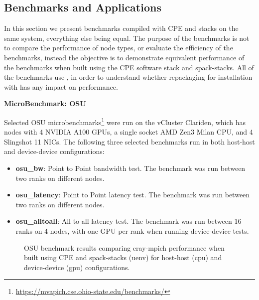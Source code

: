 \subsection{Benchmarks and Applications}

In this section we present benchmarks compiled with CPE and \spack stacks on the same system, everything else being equal.
The purpose of the benchmarks is not to compare the performance of node types, or evaluate the efficiency of the benchmarks, instead the objective is to demonstrate equivalent performance of the benchmarks when built using the CPE software stack and spack-stacks.
All of the benchmarks use \craympich, in order to understand whether repackaging \craympich for installation with \spack has any impact on performance.

\noindent\textbf{MicroBenchmark: OSU}

Selected OSU microbenchmarks\footnote{\url{https://mvapich.cse.ohio-state.edu/benchmarks/}} were run on the vCluster Clariden, which has nodes with 4 NVIDIA  A100 GPUs, a single socket AMD Zen3 Milan CPU, and 4 Slingshot 11 NICs.
The following three selected benchmarks run in both host-host and device-device configurations:
\begin{itemize}
    \item \textbf{osu\_bw}: Point to Point bandwidth test. The benchmark was run between two ranks on different nodes.
    \item \textbf{osu\_latency}: Point to Point latency test. The benchmark was run between two ranks on different nodes.
    \item \textbf{osu\_alltoall}: All to all latency test. The benchmark was run between 16 ranks on 4 nodes, with one GPU per rank when running device-device tests.
\end{itemize}

\begin{figure}[htp!]
    \begin{center}
        
        \hfill
        
        \newline
        
        \hfill
        
        \newline
        
        \hfill
        
    \end{center}
    \caption{OSU benchmark results comparing cray-mpich performance when built using CPE and spack-stacks (uenv) for host-host (cpu) and device-device (gpu) configurations.}
    \label{fig:osu}
\end{figure}

